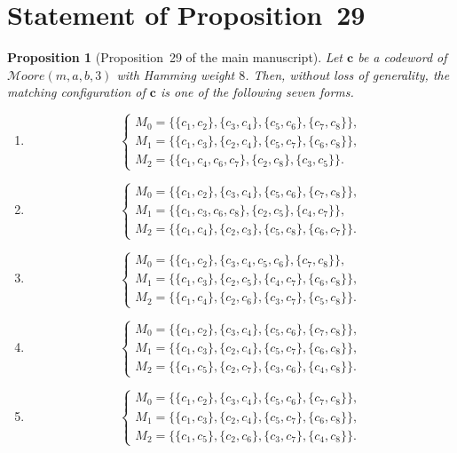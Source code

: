 \documentclass[11pt]{article}
\newcommand{\boldc}{\boldsymbol{c}}
\newcommand{\Moore}{\mathcal{M}oore}
\newtheorem{prop}{Proposition}
\begin{document}
\section{Statement of Proposition~29}
\begin{prop}[Proposition~29 of the main manuscript]
Let $\boldc$ be a codeword of $\Moore(m,a,b,3)$ with Hamming weight $8$. Then, without loss of generality, the matching configuration of $\boldc$ is one of the following seven forms.

\begin{enumerate}[label=\textbf{Case \Roman*:},leftmargin=*]
\item
\[
\begin{cases}
M_0=\{\{c_1,c_2\},\{c_3,c_4\},\{c_5,c_6\},\{c_7,c_8\}\},\\
M_1=\{\{c_1,c_3\},\{c_2,c_4\},\{c_5,c_7\},\{c_6,c_8\}\},\\
M_2=\{\{c_1,c_4,c_6,c_7\},\{c_2,c_8\},\{c_3,c_5\}\}.
\end{cases}
\]
\item
\[
\begin{cases}
M_0=\{\{c_1,c_2\},\{c_3,c_4\},\{c_5,c_6\},\{c_7,c_8\}\},\\
M_1=\{\{c_1,c_3,c_6,c_8\},\{c_2,c_5\},\{c_4,c_7\}\},\\
M_2=\{\{c_1,c_4\},\{c_2,c_3\},\{c_5,c_8\},\{c_6,c_7\}\}.
\end{cases}
\]
\item
\[
\begin{cases}
M_0=\{\{c_1,c_2\},\{c_3,c_4,c_5,c_6\},\{c_7,c_8\}\},\\
M_1=\{\{c_1,c_3\},\{c_2,c_5\},\{c_4,c_7\},\{c_6,c_8\}\},\\
M_2=\{\{c_1,c_4\},\{c_2,c_6\},\{c_3,c_7\},\{c_5,c_8\}\}.
\end{cases}
\]
\item
\[
\begin{cases}
M_0=\{\{c_1,c_2\},\{c_3,c_4\},\{c_5,c_6\},\{c_7,c_8\}\},\\
M_1=\{\{c_1,c_3\},\{c_2,c_4\},\{c_5,c_7\},\{c_6,c_8\}\},\\
M_2=\{\{c_1,c_5\},\{c_2,c_7\},\{c_3,c_6\},\{c_4,c_8\}\}.
\end{cases}
\]
\item
\[
\begin{cases}
M_0=\{\{c_1,c_2\},\{c_3,c_4\},\{c_5,c_6\},\{c_7,c_8\}\},\\
M_1=\{\{c_1,c_3\},\{c_2,c_4\},\{c_5,c_7\},\{c_6,c_8\}\},\\
M_2=\{\{c_1,c_5\},\{c_2,c_6\},\{c_3,c_7\},\{c_4,c_8\}\}.

\end{cases}\]
\end{enumerate}
\end{prop}
\end{document}
